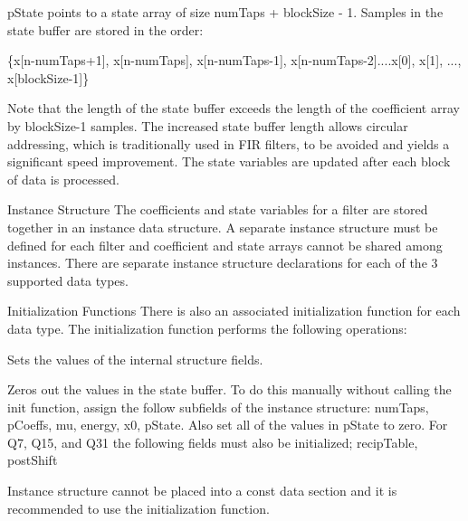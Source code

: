 \begin{DoxyParagraph}{}
{\ttfamily p\+State} points to a state array of size {\ttfamily num\+Taps + block\+Size -\/ 1}. Samples in the state buffer are stored in the order\+: 
\end{DoxyParagraph}
\begin{DoxyParagraph}{}

\begin{DoxyPre}
    \{x[n-numTaps+1], x[n-numTaps], x[n-numTaps-1], x[n-numTaps-2]....x[0], x[1], ..., x[blockSize-1]\}
 \end{DoxyPre}
 
\end{DoxyParagraph}
\begin{DoxyParagraph}{}
Note that the length of the state buffer exceeds the length of the coefficient array by {\ttfamily block\+Size-\/1} samples. The increased state buffer length allows circular addressing, which is traditionally used in F\+IR filters, to be avoided and yields a significant speed improvement. The state variables are updated after each block of data is processed. 
\end{DoxyParagraph}
\begin{DoxyParagraph}{Instance Structure}
The coefficients and state variables for a filter are stored together in an instance data structure. A separate instance structure must be defined for each filter and coefficient and state arrays cannot be shared among instances. There are separate instance structure declarations for each of the 3 supported data types.
\end{DoxyParagraph}
\begin{DoxyParagraph}{Initialization Functions}
There is also an associated initialization function for each data type. The initialization function performs the following operations\+:
\begin{DoxyItemize}
\item Sets the values of the internal structure fields.
\item Zeros out the values in the state buffer. To do this manually without calling the init function, assign the follow subfields of the instance structure\+: num\+Taps, p\+Coeffs, mu, energy, x0, p\+State. Also set all of the values in p\+State to zero. For Q7, Q15, and Q31 the following fields must also be initialized; recip\+Table, post\+Shift
\end{DoxyItemize}
\end{DoxyParagraph}
\begin{DoxyParagraph}{}
Instance structure cannot be placed into a const data section and it is recommended to use the initialization function. 
\end{DoxyParagraph}
